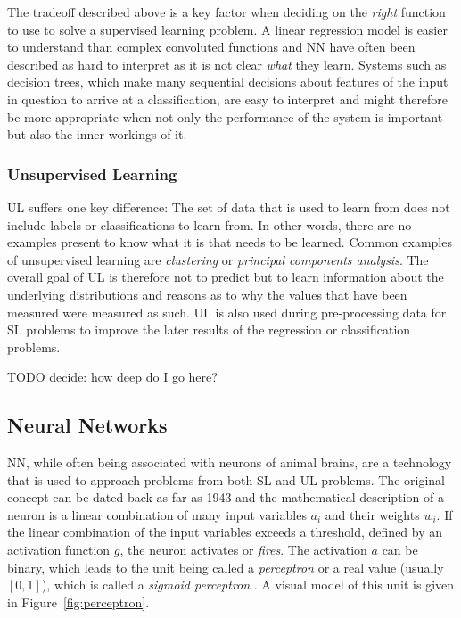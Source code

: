 The tradeoff described above is a key factor when deciding on the \emph{right}
function to use to solve a supervised learning problem. A linear regression
model is easier to understand than complex convoluted functions and \ac {NN}
have often been described as hard to interpret as it is not clear \emph{what}
they learn. Systems such as decision trees, which make many sequential decisions
about features of the input in question to arrive at a classification, are easy
to interpret and might therefore be more appropriate when not only the
performance of the system is important but also the inner workings of it.
\subsubsection{Unsupervised Learning}
\acl {UL}  suffers one key difference: The set of data that is used to learn from does not include labels or
classifications to learn from. In other words, there are no examples present to know what it is that needs to be
learned. Common examples of unsupervised learning are \emph{clustering} or \emph{principal components analysis}. The
overall goal of \ac {UL} is therefore not to predict but to learn information about the underlying distributions and
reasons as to why the values that have been measured were measured as such. \ac {UL} is also used during pre-processing
data for \ac {SL} problems to improve the later results of the regression or classification problems. 

TODO decide: how deep do I go here?
\subsection{Neural Networks}%
\label{sec:neural_networks}

\acl {NN}, while often being associated with neurons of animal brains, are a technology that is used to approach
problems from both \ac {SL} and \ac {UL} problems. The original concept can be dated back as far as 1943
\cite[p.727]{russell2016artificial} and the mathematical description of a neuron is a linear combination of many input
variables $a_i$ and their weights $w_i$. If the linear combination of the input variables exceeds a threshold, defined
by an activation function $g$, the neuron activates or \emph{fires}.
The activation $a$ can be binary, which leads to the unit being called a \emph{perceptron} or a real value (usually
$[0,1]$), which is called a \emph{sigmoid perceptron} \cite[p.729]{russell2016artificial}. A visual model of this unit
is given in Figure~\ref{fig:perceptron}.


